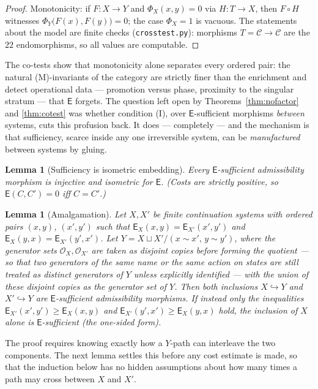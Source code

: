 \documentclass[11pt]{article}
\newtheorem{lemma}[theorem]{Lemma}
\theoremstyle{remark}
\newcommand{\C}{\mathcal{C}}
\newcommand{\Ops}{\mathcal{O}}
\newcommand{\E}{\mathsf{E}}
\begin{document}
\begin{proof}
Monotonicity: if $F\colon X\to Y$ and $\Phi_{X}(x,y)=0$ via
$H\colon T\to X$, then $F\circ H$ witnesses
$\Phi_{Y}\bigl(F(x),F(y)\bigr)=0$; the case $\Phi_{X}=1$ is vacuous.
The statements about the model are finite checks
(\texttt{crosstest.py}): morphisms $T=\C\to\C$ are the $22$
endomorphisms, so all values are computable.
\end{proof}

The co-tests show that monotonicity alone separates every ordered
pair: the natural (M)-invariants of the category are strictly finer
than the enrichment and detect operational data --- promotion versus
phase, proximity to the singular stratum --- that $\E$ forgets. The
question left open by Theorems~\ref{thm:nofactor} and
\ref{thm:cotest} was whether condition (I), over $\E$-sufficient
morphisms \emph{between} systems, cuts this profusion back. It does
--- completely --- and the mechanism is that sufficiency, scarce
inside any one irreversible system, can be \emph{manufactured}
between systems by gluing.

\begin{lemma}[Sufficiency is isometric embedding]\label{lem:embed}
Every $\E$-sufficient admissibility morphism is injective and
isometric for $\E$. (Costs are strictly positive, so
$\E(C,C')=0$ iff $C=C'$.)
\end{lemma}

\begin{lemma}[Amalgamation]\label{lem:amalgam}
Let $X,X'$ be finite continuation systems with ordered pairs $(x,y)$,
$(x',y')$ such that $\E_{X}(x,y)=\E_{X'}(x',y')$ and
$\E_{X}(y,x)=\E_{X'}(y',x')$. Let $Y = X \sqcup X' / (x\!\sim\!x',\,
y\!\sim\!y')$, where the generator sets $\Ops_X,\Ops_{X'}$ are taken
as disjoint copies before forming the quotient — so that two
generators of the same name or the same action on states are still
treated as distinct generators of $Y$ unless explicitly identified —
with the union of these disjoint copies as the generator set of $Y$. Then both
inclusions $X\hookrightarrow Y$ and $X'\hookrightarrow Y$ are
$\E$-sufficient admissibility morphisms. If instead only the
inequalities $\E_{X'}(x',y') \ge \E_{X}(x,y)$ and
$\E_{X'}(y',x') \ge \E_{X}(y,x)$ hold, the inclusion of $X$ alone is
$\E$-sufficient (the one-sided form).
\end{lemma}

The proof requires knowing exactly how a $Y$-path can interleave the
two components. The next lemma settles this before any cost estimate
is made, so that the induction below has no hidden assumptions about
how many times a path may cross between $X$ and $X'$.
\end{document}
